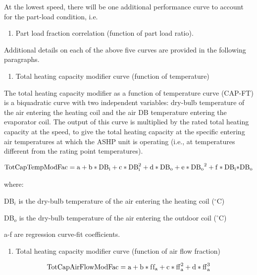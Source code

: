 At the lowest speed, there will be one additional performance curve to account for the part-load condition, i.e.

\begin{enumerate}
\def\labelenumi{\arabic{enumi})}
\setcounter{enumi}{4}
\item Part load fraction correlation (function of part load ratio).
\end{enumerate}

Additional details on each of the above five curves are provided in the following paragraphs.

\begin{enumerate}
\def\labelenumi{\arabic{enumi})}
\tightlist
\item
  Total heating capacity modifier curve (function of temperature)
\end{enumerate}

The total heating capacity modifier as a function of temperature curve (CAP-FT) is a biquadratic curve with two independent variables: dry-bulb temperature of the air entering the heating coil and the air DB temperature entering the evaporator coil. The output of this curve is multiplied by the rated total heating capacity at the speed, to give the total heating capacity at the specific entering air temperatures at which the ASHP unit is operating (i.e., at temperatures different from the rating point temperatures).

\begin{equation}
{\rm{TotCapTempModFac}} = {\rm{a}} + {\rm{b*D}}{{\rm{B}}_{\rm{i}}} + {\rm{c*DB}}_{\rm{i}}^2 + {\rm{d*D}}{{\rm{B}}_{\rm{o}}} + {\rm{e*D}}{{\rm{B}}_{\rm{o}}}^2 + {\rm{f*D}}{{\rm{B}}_{\rm{i}}}{\rm{*D}}{{\rm{B}}_{\rm{o}}}
\end{equation}

where:

DB\(_{i}\) is the dry-bulb temperature of the air entering the heating coil (\(^{\circ}\)C)

DB\(_{o}\) is the dry-bulb temperature of the air entering the outdoor coil (\(^{\circ}\)C)

a-f are regression curve-fit coefficients.

\begin{enumerate}
\def\labelenumi{\arabic{enumi})}
\setcounter{enumi}{1}
\tightlist
\item
  Total heating capacity modifier curve (function of air flow fraction)
\end{enumerate}

\begin{equation}
{\rm{TotCapAirFlowModFac}} = {\rm{a}} + {\rm{b*f}}{{\rm{f}}_{\rm{a}}} + {\rm{c*ff}}_{\rm{a}}^2 + {\rm{d*ff}}_{\rm{a}}^3
\end{equation}

